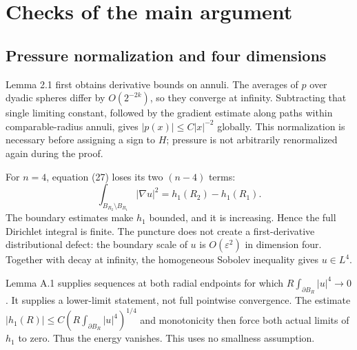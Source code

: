 \documentclass[10pt]{article}
\begin{document}
\section*{Checks of the main argument}
\subsection*{Pressure normalization and four dimensions}
Lemma 2.1 first obtains derivative bounds on annuli. The averages of \(p\) over dyadic spheres differ by \(O(2^{-2k})\), so they converge at infinity. Subtracting that single limiting constant, followed by the gradient estimate along paths within comparable-radius annuli, gives \(|p(x)|\leq C|x|^{-2}\) globally. This normalization is necessary before assigning a sign to \(H\); pressure is not arbitrarily renormalized again during the proof.\par
For \(n=4\), equation (27) loses its two \((n-4)\) terms: \[\int_{B_{R_2}\setminus B_{R_1}}|\nabla u|^2
=h_1(R_2)-h_1(R_1).\] The boundary estimates make \(h_1\) bounded, and it is increasing. Hence the full Dirichlet integral is finite. The puncture does not create a first-derivative distributional defect: the boundary scale of \(u\) is \(O(\varepsilon^2)\) in dimension four. Together with decay at infinity, the homogeneous Sobolev inequality gives \(u\in L^4\).\par
Lemma A.1 supplies sequences at both radial endpoints for which \(R\int_{\partial B_R}|u|^4\to0\). It supplies a lower-limit statement, not full pointwise convergence. The estimate \(|h_1(R)|\leq C(R\int_{\partial B_R}|u|^4)^{1/4}\) and monotonicity then force both actual limits of \(h_1\) to zero. Thus the energy vanishes. This uses no smallness assumption.\par
\end{document}
